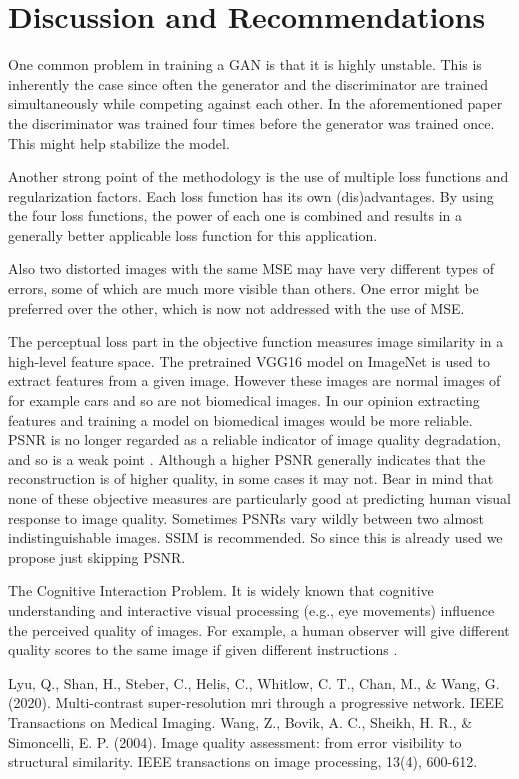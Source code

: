 \documentclass[conference]{IEEEtran}
\begin{document}
\section{Discussion and Recommendations}
One common problem in training a GAN is that it is
highly unstable. This is inherently the case since often the generator and the
discriminator are trained simultaneously while competing against each other. In
the aforementioned paper the discriminator was trained four times before the
generator was trained once. This might help stabilize the model.

Another strong point of the methodology is the use of multiple loss functions
and regularization factors. Each loss function has its own (dis)advantages. By
using the four loss functions, the power of each one is combined and results in
a generally better applicable loss function for this application.

Also two distorted images with the same MSE may have very different types of
errors, some of which are much more visible than others. One error might be
preferred over the other, which is now not addressed with the use of MSE.

The perceptual loss part in the objective function measures image similarity in
a high-level feature space. The pretrained VGG16 model on ImageNet is used to
extract features from a given image. However these images are normal images of
for example cars and so are not biomedical images. In our opinion extracting
features and training a model on biomedical images would be more reliable.
\newpage
PSNR is no longer regarded as a reliable indicator of image quality degradation,
and so is a weak point \cite{b2}. Although a higher PSNR generally indicates that the
reconstruction is of higher quality, in some cases it may not. Bear in mind that
none of these objective measures are particularly good at predicting human
visual response to image quality. Sometimes PSNRs vary wildly between two almost
indistinguishable images. SSIM is recommended. So since this is already used we
propose just skipping PSNR.

The Cognitive Interaction Problem. It is widely known that cognitive
understanding and interactive visual processing (e.g., eye movements) influence
the perceived quality of images. For example, a human observer will give
different quality scores to the same image if given different instructions
\cite{b2}.

\begin{thebibliography}{00}
 Lyu, Q., Shan, H., Steber, C., Helis, C., Whitlow, C. T., Chan, M.,
  & Wang, G. (2020). Multi-contrast super-resolution mri through a progressive
  network. IEEE Transactions on Medical Imaging.
 Wang, Z., Bovik, A. C., Sheikh, H. R., & Simoncelli, E. P. (2004).
  Image quality assessment: from error visibility to structural similarity. IEEE
  transactions on image processing, 13(4), 600-612.

\end{thebibliography}
\end{document}

